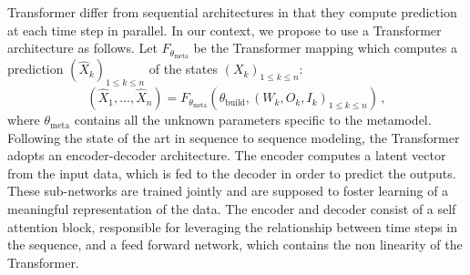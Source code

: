 \documentclass[12pt]{article}
\begin{document}
Transformer differ from sequential architectures in that they compute prediction at each time step in parallel. In our context, we propose to use a Transformer architecture as follows. Let $F_{\theta_{\mathrm{meta}}}$ be the Transformer mapping which computes a prediction  $(\widehat X_{k})_{1\leqslant k\leqslant n}$ of the states $(X_{k})_{1\leqslant k\leqslant n}$:
$$
    (\widehat X_1,\ldots,\widehat X_n) = F_{\theta_{\mathrm{meta}}}(\theta_{\mathrm{build}}, (W_k,O_k,I_k)_{1\leqslant k\leqslant n})\,,
$$
where $\theta_{\mathrm{meta}}$ contains all the unknown parameters specific to the metamodel.
Following the state of the art in sequence to sequence modeling, the Transformer  adopts an encoder-decoder architecture. The encoder computes a latent vector from the input data, which is fed to the decoder in order to predict the outputs. These sub-networks are trained jointly and are supposed to foster learning of a meaningful representation of the data. The encoder and decoder consist of a self attention block, responsible for leveraging the relationship between time steps in the sequence, and a feed forward network, which contains the non linearity of the Transformer.
\end{document}
